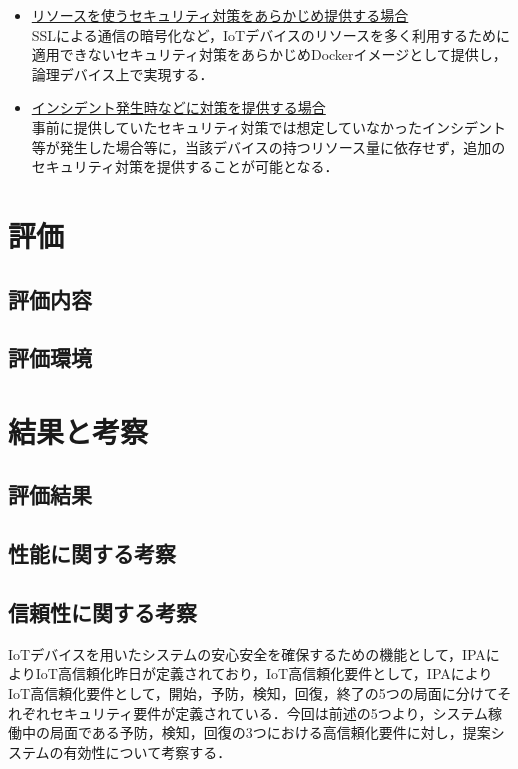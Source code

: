 \documentclass[Japanese]{dicomopapers}
\begin{document}
\begin{itemize}
	\item \underline{リソースを使うセキュリティ対策をあらかじめ提供する場合}\mbox{}\\
	      SSLによる通信の暗号化など，IoTデバイスのリソースを多く利用するために適用できないセキュリティ対策をあらかじめDockerイメージとして提供し，論理デバイス上で実現する．
	\item \underline{インシデント発生時などに対策を提供する場合}\mbox{}\\
	      事前に提供していたセキュリティ対策では想定していなかったインシデント等が発生した場合等に，当該デバイスの持つリソース量に依存せず，追加のセキュリティ対策を提供することが可能となる．
\end{itemize}

\section{評価}
\subsection{評価内容}

\subsection{評価環境}

\section{結果と考察}
\subsection{評価結果}

\subsection{性能に関する考察}

\subsection{信頼性に関する考察}
IoTデバイスを用いたシステムの安心安全を確保するための機能として，IPAによりIoT高信頼化昨日が定義されており，IoT高信頼化要件として，IPAによりIoT高信頼化要件として，開始，予防，検知，回復，終了の5つの局面に分けてそれぞれセキュリティ要件が定義されている\cite{IPA}．今回は前述の5つより，システム稼働中の局面である予防，検知，回復の3つにおける高信頼化要件に対し，提案システムの有効性について考察する．
\end{document}
